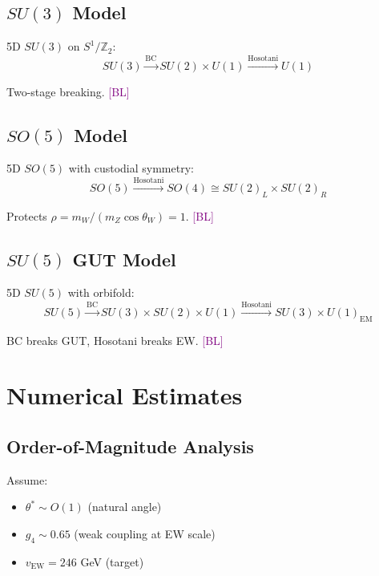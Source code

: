 \documentclass[11pt,a4paper]{article}
\newcommand{\tagBL}{\textcolor{purple}{[BL]}}
\begin{document}
\subsection{$SU(3)$ Model}

5D $SU(3)$ on $S^1/\mathbb{Z}_2$:
\begin{equation}
\label{eq:su3-breaking}
SU(3) \xrightarrow{\text{BC}} SU(2) \times U(1) \xrightarrow{\text{Hosotani}} U(1)
\end{equation}

Two-stage breaking. \tagBL

\subsection{$SO(5)$ Model}

5D $SO(5)$ with custodial symmetry:
\begin{equation}
\label{eq:so5-breaking}
SO(5) \xrightarrow{\text{Hosotani}} SO(4) \cong SU(2)_L \times SU(2)_R
\end{equation}

Protects $\rho = m_W/(m_Z \cos\theta_W) = 1$. \tagBL

\subsection{$SU(5)$ GUT Model}

5D $SU(5)$ with orbifold:
\begin{equation}
\label{eq:su5-hosotani}
SU(5) \xrightarrow{\text{BC}} SU(3) \times SU(2) \times U(1) \xrightarrow{\text{Hosotani}} SU(3) \times U(1)_{\text{EM}}
\end{equation}

BC breaks GUT, Hosotani breaks EW. \tagBL

\section{Numerical Estimates}

\subsection{Order-of-Magnitude Analysis}

Assume:
\begin{itemize}
    \item $\theta^* \sim O(1)$ (natural angle)
    \item $g_4 \sim 0.65$ (weak coupling at EW scale)
    \item $v_{\text{EW}} = 246$ GeV (target)
\end{itemize}
\end{document}
